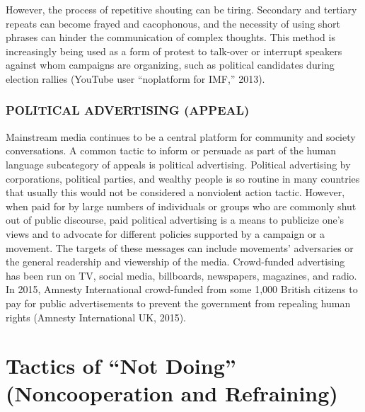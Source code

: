 \documentclass[twoside,a4paper,12pt,fleqn,openany]{extbook}
\begin{document}
However, the process of repetitive shouting can be tiring. Secondary and tertiary repeats can become frayed and cacophonous, and the necessity of using short phrases can hinder the communication of complex thoughts. This method is increasingly being used as a form of protest to talk-over or interrupt speakers against whom campaigns are organizing, such as political candidates during election rallies (YouTube user “noplatform for IMF,” 2013).

\subsubsection*{POLITICAL ADVERTISING (APPEAL)}

Mainstream media continues to be a central platform for community and society conversations. A common tactic to inform or persuade as part of the human language subcategory of appeals is political advertising. Political advertising by corporations, political parties, and wealthy people is so routine in many countries that usually this would not be considered a nonviolent action tactic. However, when paid for by large numbers of individuals or groups who are commonly shut out of public discourse, paid political advertising is a means to publicize one’s views and to advocate for different policies supported by a campaign or a movement. The targets of these messages can include movements’ adversaries or the general readership and viewership of the media. Crowd-funded advertising has been run on TV, social media, billboards, newspapers, magazines, and radio. In 2015, Amnesty International crowd-funded from some 1,000 British citizens to pay for public advertisements to prevent the government from repealing human rights (Amnesty International UK, 2015).

\section*{Tactics of “Not Doing” (Noncooperation and Refraining)}
\end{document}
